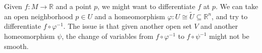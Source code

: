 
Given $f : M \to \mathbb{R} $ and a point $p$, we might want to differentiate $f$ at $p$. We can take an open neighborhood $p\in U$ and a homeomorphism $\varphi : U \cong \widetilde{U} \subseteq \mathbb{R} ^n$, and try to differentiate $f\circ \varphi ^{-1} $. The issue is that given another open set $V$ and another homeomorphism $\psi $, the change of variables from $f\circ \varphi ^{-1} $ to $f\circ \psi ^{-1} $ might not be smooth.
